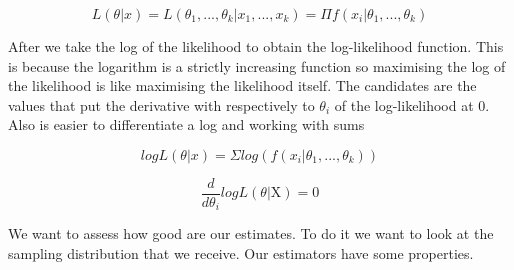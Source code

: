 \begin{equation}
    L(\theta|x) = L(\theta_1, ..., \theta_k | x_1, ..., x_k) = \Pi f(x_i|\theta_1, ..., \theta_k)
\end{equation}

After we take the log of the likelihood to obtain the log-likelihood function. This is because the logarithm is
a strictly increasing function so maximising the log of the likelihood is like maximising
the likelihood itself. The candidates are the values that put the derivative with respectively
to $\theta_i$ of the log-likelihood at 0. Also is easier to differentiate a log and working with sums

\begin{equation}
    logL(\theta|x) = \Sigma log(f(x_i | \theta_1, ..., \theta_k))
\end{equation}

\begin{equation}
    \frac{d}{d\theta_i} logL(\theta|\text{X}) = 0
\end{equation}

\vspace{10pt}

We want to assess how good are our estimates. To do it we want to look at the sampling distribution
that we receive. Our estimators have some properties.


